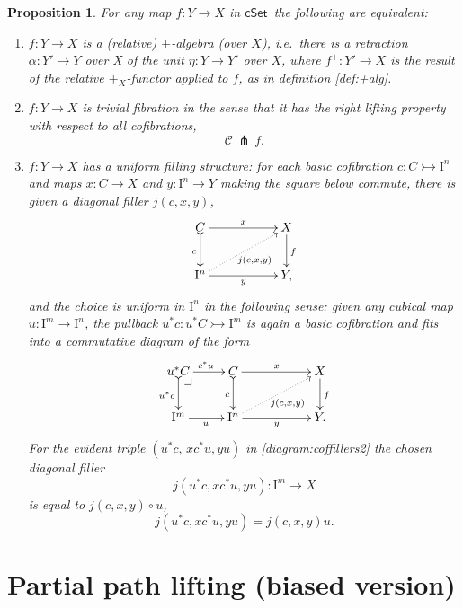 \documentclass[11pt]{article}
\makeatletter
\newcommand{\cSet}{\ensuremath{\mathsf{cSet}}}
\newcommand{\pbcorner}[1][dr]{\save*!/#1-1.2pc/#1:(-1,1)@^{|-}\restore}
\newcommand{\mono}{\ensuremath{\rightarrowtail}}
\newcommand{\ra}{\ensuremath{\rightarrow}}
\newcommand{\I}{\ensuremath{\mathrm{I}}}
\newtheorem{proposition}[theorem]{Proposition}
\theoremstyle{remark}
\theoremstyle{definition}
\makeatother
\begin{document}
 \begin{proposition}\label{prop:uniformstructequivrelative} For any map $f : Y\to X$ in \cSet\ the following are equivalent:
\begin{enumerate}
\item $f:Y\ra X$ is a \emph{(relative) $+$-algebra (over $X$)}, i.e.\ there is a retraction  $\alpha :Y' \ra Y$ over X of the unit $\eta : Y\ra Y'$ over $X$, where $f^+ : Y' \ra X$ is the result of the relative $+_X$-functor applied to $f$, as in definition \ref{def:+alg}.
\item $f:Y\ra  X$ is  \emph{trivial fibration} in the sense that it has the right lifting property with respect to all cofibrations,
\[
\mathcal{C}\, \pitchfork\,f.
\]
\item $f:Y\ra  X$ has a \emph{uniform filling structure}: 
for each basic cofibration $c : C \mono \I^{n}$ and maps $x : C\ra X$ and $y : \I^n\ra Y$ making the square below commute, there is given a diagonal filler $j(c,x,y)$,
\begin{equation}\label{diagram:coffillers}
\xymatrix{
C \ar@{>->}[d]_{c} \ar[rr]^{x} && X \ar[d]^{f} \\
\I^{n}\ar@{.>}[rru]_{j(c,x,y)} \ar[rr]_{y} && Y,
}
\end{equation}
and the choice is \emph{uniform in $\I^n$} in the following sense: given any cubical map $u : \I^m \ra \I^n$, the pullback $u^*c : u^*C\mono \I^m$ is again a basic cofibration and fits into a commutative diagram of the form
\begin{equation}\label{diagram:coffillers2}
\xymatrix{
u^*C \ar@{>->}[d]_{u^*c} \ar[r]^{c^*u} \pbcorner &  C \ar@{>->}[d]_{c} \ar[rr]^{x} && X\ar[d]^{f} \\
\I^{m} \ar[r]_{u} & \I^{n} \ar@{.>}[rru]_{j(c,x,y)} \ar[rr]_{y} && Y.
}
\end{equation}
For the evident triple $(u^*c,\, xc^*u, yu)$ in \eqref{diagram:coffillers2} the chosen diagonal filler $$j(u^*c,xc^*u,yu): \I^m \to X$$ is equal to  $j(c,x,y)\circ u$,
\begin{equation}\label{eq:uniformfillers}
j(u^*c,xc^*u,yu) = j(c,x,y)u.
\end{equation}
\end{enumerate}
\end{proposition}


\section{Partial path lifting (biased version)}\label{sec:biasedfibration}
\end{document}
